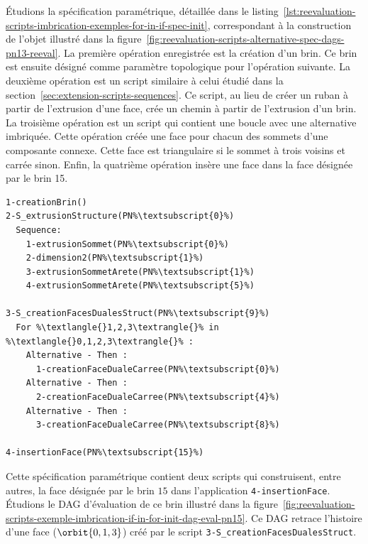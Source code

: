 Étudions la spécification paramétrique, détaillée dans le
listing~\ref{lst:reevaluation-scripts-imbrication-exemples-for-in-if-spec-init},
correspondant à la construction de l'objet illustré dans la
figure~\ref{fig:reevaluation-scripts-alternative-spec-dags-pn13-reeval}. %
La première opération enregistrée est la création d'un brin. %
Ce brin est ensuite désigné comme paramètre topologique pour l'opération
suivante. %
La deuxième opération est un script similaire à celui étudié dans la
section~\ref{sec:extension-scripts-sequences}. %
Ce script, au lieu de créer un ruban à partir de l'extrusion d'une face, crée un
chemin à partir de l'extrusion d'un brin. %
La troisième opération est un script qui contient une boucle avec une
alternative imbriquée. %
Cette opération créée une face pour chacun des sommets d'une composante
connexe. %
Cette face est triangulaire si le sommet à trois voisins et carrée sinon. %
Enfin, la quatrième opération insère une face dans la face désignée par le brin
15. %

\begin{lstlisting}[style=script-style,
escapechar=\%,
caption=Spécification paramétrique initiale de la création du dual d'un chemin 2D,
label=lst:reevaluation-scripts-imbrication-exemples-for-in-if-spec-init,
captionpos=b]
1-creationBrin()
2-S_extrusionStructure(PN%\textsubscript{0}%)
  Sequence:
    1-extrusionSommet(PN%\textsubscript{0}%)
    2-dimension2(PN%\textsubscript{1}%)
    3-extrusionSommetArete(PN%\textsubscript{1}%)
    4-extrusionSommetArete(PN%\textsubscript{5}%)

3-S_creationFacesDualesStruct(PN%\textsubscript{9}%)
  For %\textlangle{}1,2,3\textrangle{}% in %\textlangle{}0,1,2,3\textrangle{}% :
    Alternative - Then :
      1-creationFaceDualeCarree(PN%\textsubscript{0}%)
    Alternative - Then :
      2-creationFaceDualeCarree(PN%\textsubscript{4}%)
    Alternative - Then :
      3-creationFaceDualeCarree(PN%\textsubscript{8}%)

4-insertionFace(PN%\textsubscript{15}%)
\end{lstlisting}

Cette spécification paramétrique contient deux scripts qui construisent, entre
autres, la face désignée par le brin \(15\) dans l'application
\texttt{4-insertionFace}. %
Étudions le DAG d'évaluation de ce brin illustré dans la
figure~\ref{fig:reevaluation-scripts-exemple-imbrication-if-in-for-init-dag-eval-pn15}. %
Ce DAG retrace l'histoire d'une face (\(\orbit{0,1,3}\)) créé par le script
\texttt{3\allowbreak{}-\allowbreak{}S\allowbreak{}\_\allowbreak{}creation\-Faces\-Duales\-Struct}. %

